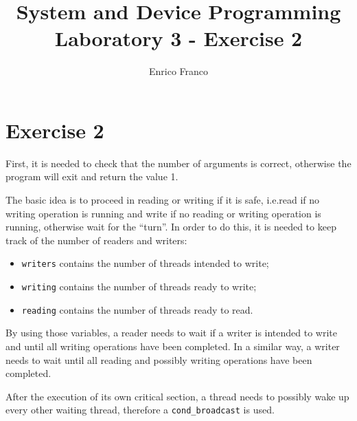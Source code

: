 \documentclass{report}
\author{Enrico Franco}
\title{System and Device Programming \\
	Laboratory 3 - Exercise 2}
\begin{document}
\section*{Exercise 2}
First, it is needed to check that the number of arguments is correct, otherwise the program will exit and return the value 1.

The basic idea is to proceed in reading or writing if it is safe, i.e.\@ read if no writing operation is running and write if no reading or writing operation is running, otherwise wait for the ``turn''. In order to do this, it is needed to keep track of the number of readers and writers:
\begin{itemize}
\item \texttt{writers} contains the number of threads intended to write;
\item \texttt{writing} contains the number of threads ready to write;
\item \texttt{reading} contains the number of threads ready to read.
\end{itemize}
By using those variables, a reader needs to wait if a writer is intended to write and until all writing operations have been completed. In a similar way, a writer needs to wait until all reading and possibly writing operations have been completed.

After the execution of its own critical section, a thread needs to possibly wake up every other waiting thread, therefore a \texttt{cond\_broadcast} is used.
\end{document}
